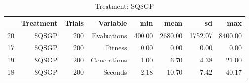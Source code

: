\begin{table}[ht]
\centering
\begin{tabular}{rrrrrrrr}
  \hline
 & Treatment & Trials & Variable & min & mean & sd & max \\ 
  \hline
20 & SQSGP & 200 & Evaluations & 400.00 & 2680.00 & 1752.07 & 8400.00 \\ 
  17 & SQSGP & 200 & Fitness & 0.00 & 0.00 & 0.00 & 0.00 \\ 
  19 & SQSGP & 200 & Generations & 1.00 & 6.70 & 4.38 & 21.00 \\ 
  18 & SQSGP & 200 & Seconds & 2.18 & 10.70 & 7.42 & 40.17 \\ 
   \hline
\end{tabular}
\caption{Treatment: SQSGP} 
\end{table}
